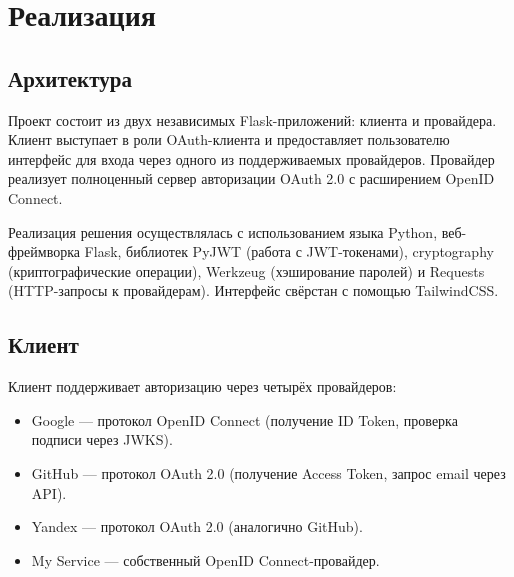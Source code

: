 \documentclass[a4paper]{article}
\begin{document}
\section{Реализация}

\subsection{Архитектура}


Проект состоит из двух независимых Flask-приложений: клиента и провайдера. Клиент выступает в роли OAuth-клиента и предоставляет пользователю интерфейс для входа через одного из поддерживаемых провайдеров. Провайдер реализует полноценный сервер авторизации OAuth 2.0 с расширением OpenID Connect.


Реализация решения осуществлялась с использованием языка Python, веб-фреймворка Flask, библиотек PyJWT (работа с JWT-токенами), cryptography (криптографические операции), Werkzeug (хэширование паролей) и Requests (HTTP-запросы к провайдерам). Интерфейс свёрстан с помощью TailwindCSS.


\subsection{Клиент}

Клиент поддерживает авторизацию через четырёх провайдеров:
\begin{itemize}
    \item Google --- протокол OpenID Connect (получение ID Token, проверка подписи через JWKS).
    \item GitHub --- протокол OAuth 2.0 (получение Access Token, запрос email через API).
    \item Yandex --- протокол OAuth 2.0 (аналогично GitHub).
    \item My Service --- собственный OpenID Connect-провайдер.
\end{itemize}
\end{document}
